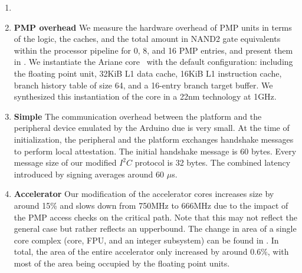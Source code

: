 \begin{enumerate}
\begin{table}[tbp]
    \label{tab:eval:ariane}
\end{table}
\item 


\item \textbf{PMP overhead}
We measure the hardware overhead of PMP units in terms of the logic, the caches, and the total amount in NAND2 gate equivalents within the processor pipeline for 0, 8, and 16 PMP entries, and present them in . We instantiate the Ariane core~\cite{ariane} with the default configuration: including the floating point unit, 32KiB L1 data cache, 16KiB L1 instruction cache, branch history table of size 64, and a 16-entry branch target buffer. We synthesized this instantiation of the core in a 22nm technology at 1GHz. %

\item \textbf{Simple \sphw} The communication overhead between the platform and the peripheral device emulated by the Arduino due is very small. At the time of initialization, the peripheral and the platform exchanges handshake messages to perform local attestation. The initial handshake message is $60$ bytes. Every message size of our modified $I^2C$ protocol is 32 bytes. The combined latency introduced by signing averages around 60 $\mu$s.

\item \textbf{Accelerator} Our modification of the accelerator cores increases size by around 15\% and slows down from 750MHz to 666MHz due to the impact of the PMP access checks on the critical path. Note that this may not reflect the general case but rather reflects an upperbound. The change in area of a single core complex (core, FPU, and an integer subsystem) can be found in . In total, the area of the entire accelerator only increased by around 0.6\%, with most of the area being occupied by the floating point units.
\end{enumerate}



